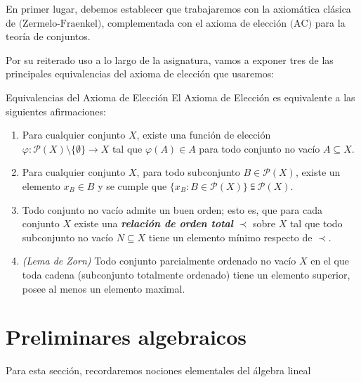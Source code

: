 \documentclass[titlepage,11pt,a4paper]{book}
\begin{document}
En primer lugar, debemos establecer que trabajaremos con la axiomática clásica de  $\text{(Zermelo-Fraenkel)}$, complementada con el axioma de elección $\text{(AC)}$ para la teoría de conjuntos.

Por su reiterado uso a lo largo de la asignatura, vamos a exponer tres de las principales equivalencias del axioma de elección que usaremos:

\begin{defn*}{Equivalencias del Axioma de Elección}
El Axioma de Elección es equivalente a las siguientes afirmaciones:
\begin{enumerate}
    \item[(1)] Para cualquier conjunto $X$, existe una función de elección $\varphi: \mathcal{P}(X) \setminus \{\emptyset\} \to X$ tal que $\varphi(A) \in A$ para todo conjunto no vacío $A \subseteq X$.
    \item[(1')] Para cualquier conjunto $X$, para todo subconjunto $B \in \mathcal{P}(X)$, existe un elemento $x_{B} \in B$ y se cumple que $\{x_{B} : B \in \mathcal{P}(X)\} \subseteqq \mathcal{P}(X)$.
    \item[(2)] Todo conjunto no vacío admite un buen orden; esto es, que para cada conjunto $X$ existe una \textbf{\textit{relación de orden total}} $\prec$ sobre $X$ tal que todo subconjunto no vacío $N \subseteq X$ tiene un elemento mínimo respecto de $\prec$.
    \item[(3)] \textit{(Lema de Zorn)} Todo conjunto parcialmente ordenado no vacío $X$ en el que toda cadena (subconjunto totalmente ordenado) tiene un elemento superior, posee al menos un elemento maximal.
\end{enumerate}
\end{defn*}




\section*{Preliminares algebraicos}

Para esta sección, recordaremos nociones elementales del álgebra lineal
\end{document}
